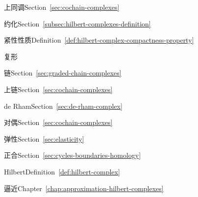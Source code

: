 \begin{theindex}
\item {}\label{index:cohomology}{上同调}\quad Section~\ref{sec:cochain-complexes}

\subitem {}\label{index:cohomology-reduced}{约化}\quad Section~\ref{subsec:hilbert-complexes-definition}

\item {}\label{index:compactness-property}{紧性性质}\quad Definition~\ref{def:hilbert-complex-compactness-property}

\item {}\label{index:complex}{复形}

\subitem {}\label{index:complex-chain}{链}\quad Section~\ref{sec:graded-chain-complexes}

\subitem {}\label{index:complex-cochain}{上链}\quad Section~\ref{sec:cochain-complexes}

\subitem {}\label{index:complex-de-rham}{de Rham}\quad Section~\ref{sec:de-rham-complex}

\subitem {}\label{index:complex-dual}{对偶}\quad Section~\ref{sec:cochain-complexes}

\subitem {}\label{index:complex-elasticity}{弹性}\quad Section~\ref{sec:elasticity}

\subitem {}\label{index:complex-exact}{正合}\quad Section~\ref{sec:cycles-boundaries-homology}

\subitem {}\label{index:complex-hilbert}{Hilbert}\quad Definition~\ref{def:hilbert-complex}

\subsubitem {}\label{index:complex-hilbert-approximation-of}{逼近}\quad Chapter~\ref{chap:approximation-hilbert-complexes}


\end{theindex}
